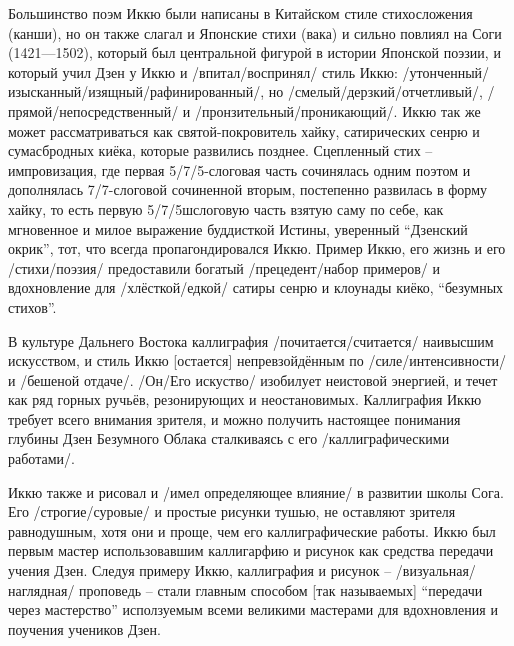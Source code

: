 \begin{ver}
Большинство поэм Иккю были написаны в Китайском стиле стихосложения
(канши), но он также слагал и Японские стихи (вака) и сильно повлиял
на Соги (1421---1502), который был центральной фигурой в истории
Японской поэзии, и который учил Дзен у Иккю и /впитал/воспринял/ стиль Иккю:
/утонченный/изысканный/изящный/рафинированный/, но
/смелый/дерзкий/отчетливый/,
/прямой/непосредственный/ и
/пронзительный/проникающий/. 
Иккю так же может рассматриваться как святой-покровитель хайку,
сатирических сенрю и сумасбродных киёка, которые развились позднее.
Сцепленный стих -- импровизация, где первая 5/7/5-слоговая часть
сочинялась одним поэтом  и дополнялась 7/7-слоговой сочиненной вторым,
постепенно развилась в форму хайку, то есть первую 5/7/5шслоговую
часть взятую саму по себе, как мгновенное и
милое выражение буддисткой Истины, уверенный ``Дзенский
окрик'', тот, что всегда пропагондировался Иккю. Пример Иккю, его
жизнь и его /стихи/поэзия/ предоставили богатый /прецедент/набор примеров/ и 
вдохновление для /хлёсткой/едкой/ сатиры сенрю и
клоунады киёко, ``безумных стихов''.
\end{ver}

\begin{ver}
  В культуре Дальнего Востока каллиграфия
  /почитается/считается/ наивысшим искусством, и стиль
  Иккю [остается] непревзойдённым по /силе/интенсивности/ и /бешеной
  отдаче/. /Он/Его искуство/ изобилует неистовой
  энергией, и течет как ряд горных ручьёв, резонирующих и
  неостановимых. Каллиграфия Иккю требует всего внимания
  зрителя, и можно получить настоящее понимания глубины Дзен Безумного
  Облака сталкиваясь с его /каллиграфическими работами/.  
\end{ver}

\begin{ver}
  Иккю также и рисовал и /имел определяющее влияние/ в развитии школы Сога. Его /строгие/суровые/ и простые
  рисунки тушью, не оставляют зрителя равнодушным, хотя они и проще, чем его
  каллиграфические работы. Иккю был первым мастер использовавшим
  каллигарфию и рисунок как средства передачи учения Дзен. Следуя
  примеру Иккю, каллиграфия и рисунок -- /визуальная/наглядная/
  проповедь -- стали главным способом [так называемых] ``передачи
  через мастерство'' исползуемым всеми великими
  мастерами для вдохновления и поучения учеников Дзен.
\end{ver}
